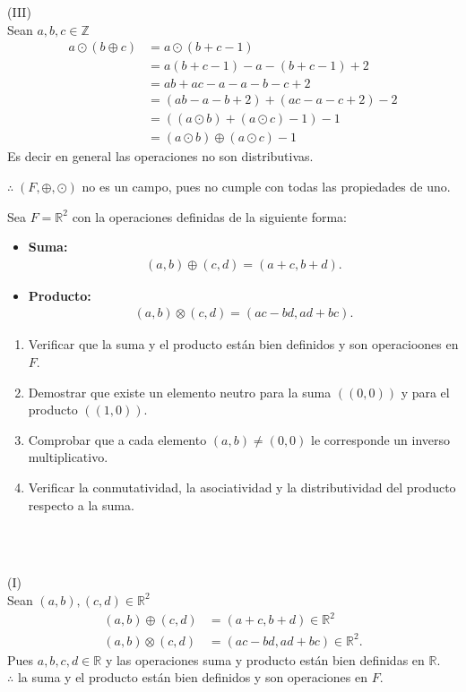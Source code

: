 \documentclass[11pt,letterpaper]{article}
\newcommand{\R}{\mathbb{R}}
\newcommand{\Z}{\mathbb{Z}}
\begin{document}
\begin{tcolorbox}
	(III)\\
	Sean $a,b,c\in\Z$
	\begin{align*}
	 a\odot(b\oplus c)&=a\odot(b+c-1)\\
	 &=a(b+c-1)-a-(b+c-1)+2\\
	 &=ab+ac-a-a-b-c+2\\
	 &=(ab-a-b+2)+(ac-a-c+2)-2\\
	 &=((a\odot b)+(a\odot c)-1)-1\\
	 &=(a\odot b)\oplus (a\odot c)-1
	\end{align*}
	Es decir en general las operaciones no son distributivas.
\end{tcolorbox}
\begin{tcolorbox}
	$\therefore\; (F,\oplus,\odot)$ no es un campo, pues no cumple con todas las propiedades de uno.
\end{tcolorbox}
\begin{tcolorbox}[
	title = \textcolor{black}{\textcolor{white}{Problema 5}},]
Sea $F=\R^2$ con la operaciones definidas de la siguiente forma:\\
	\begin{itemize}
		\item \textbf{Suma:}
		\begin{align*}
			(a,b)\oplus(c,d)=(a+c,b+d).
		\end{align*}
		\item \textbf{Producto:}
		\begin{align*}
			(a,b)\otimes(c,d)=(ac-bd,ad+bc).
		\end{align*}
	\end{itemize}

	\begin{enumerate}
		\item Verificar que la suma y el producto están bien definidos y son operacioones en $F$.
		\item Demostrar que existe un elemento neutro para la suma $((0, 0))$ y para el producto
		$((1, 0))$.
		\item Comprobar que a cada elemento $(a, b)\neq(0, 0)$ le corresponde un inverso multiplicativo.
		\item Verificar la conmutatividad, la asociatividad y la distributividad del producto 
		respecto a la suma.
	\end{enumerate}
\end{tcolorbox}\,\\\,\\
\begin{tcolorbox}[title=Demostración, colframe=G, coltitle=B, fonttitle=\bfseries]
	(I)\\
	Sean $(a,b),(c,d)\in\R^2$
	\begin{align*}
		(a,b)\oplus(c,d)&=(a+c,b+d)\in\R^2\\
		(a,b)\otimes(c,d)&=(ac-bd,ad+bc)\in\R^2.
	\end{align*}
	Pues $a,b,c,d\in\R$ y las operaciones suma y producto están bien definidas en $\R$.\\
	$\therefore$ la suma y el producto están bien definidos y son operaciones en $F$.
\end{tcolorbox}
\end{document}
